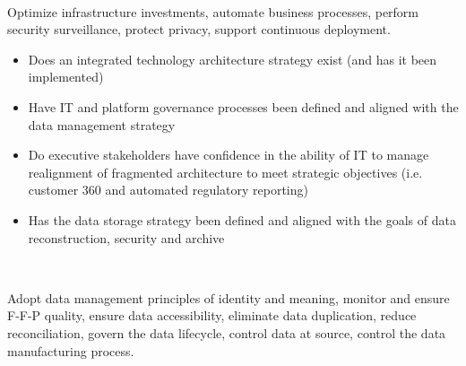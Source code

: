 \begin{description}[nosep,font=\bfseries]
  ~\\

  \item [High-Level Technology Goals]
  Optimize infrastructure investments, automate business processes, 
  perform security surveillance, protect privacy, support continuous deployment. \\

  \begin{itemize}
    \item Does an integrated technology architecture strategy exist (and has it been implemented)
    \item Have IT and platform governance processes been defined and aligned with the data management strategy
    \item Do executive stakeholders have confidence in the ability of IT to manage realignment of fragmented architecture to meet strategic objectives (i.e. customer 360 and automated regulatory reporting)
    \item Has the data storage strategy been defined and aligned with the goals of data reconstruction, security and archive
  \end{itemize}

  ~\\

  \item [High-Level Data Goals]
  Adopt data management principles of identity and meaning,
    monitor and ensure F-F-P quality,
  ensure data accessibility, eliminate data duplication, reduce reconciliation,
  govern the data lifecycle, control data at source, 
  control the data manufacturing process. \\


\end{description}
